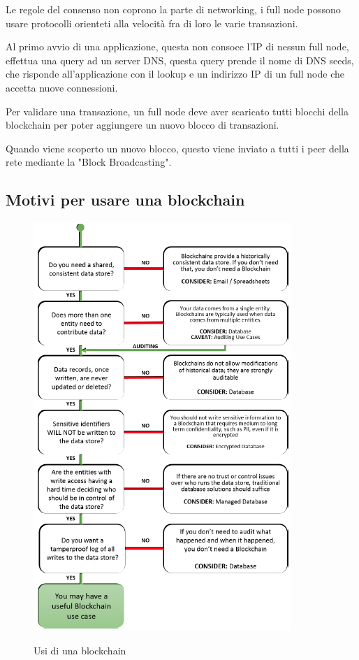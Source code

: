 Le regole del consenso non coprono la parte di networking, i full node
possono usare protocolli orienteti alla velocità fra di loro le varie transazioni.

Al primo avvio di una applicazione, questa non consoce l'IP di nessun full node, effettua una query
ad un server DNS, questa query prende il nome di DNS seeds, che risponde all'applicazione con il lookup e
un indirizzo IP di un full node che accetta nuove connessioni.

Per validare una transazione, un full node deve aver scaricato tutti blocchi della blockchain per poter
aggiungere un nuovo blocco di transazioni.

Quando viene scoperto un nuovo blocco, questo viene inviato a tutti i peer della rete 
mediante la "Block Broadcasting".

\subsection{Motivi per usare una blockchain}
\begin{figure}[h!]
    \centering
    \includegraphics[width=0.5\linewidth]{imgs/14 - motivi uso blockchain.png}
    \label{fig:why_use_blockchain}
    \caption{Usi di una blockchain}
\end{figure}

